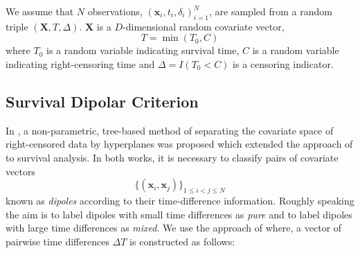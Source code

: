 \documentclass[sn-mathphys]{sn-jnl}%
\theoremstyle{thmstyleone}%
\theoremstyle{thmstyletwo}%
\theoremstyle{thmstylethree}%
\begin{document}
We assume that $N$ observations, $(\mathbf{x}_i, t_i, \delta_i)_{i = 1}^N$, are sampled from a random triple $(\mathbf{X}, T, \Delta)$.  $\mathbf{X}$ is a $D$-dimensional random covariate vector,
\[
T = \min(T_0, C)
\]
where $T_0$ is a random variable indicating survival time, $C$ is a random variable indicating right-censoring time and $\Delta = I(T_0 < C)$ is a censoring indicator.

\subsection{Survival Dipolar Criterion}

In \cite{kretowska}, a non-parametric, tree-based method of separating the covariate space of right-censored data by hyperplanes was proposed which extended the approach of \cite{bobrowskikretowski} to survival analysis. In both works, it is necessary to classify pairs of covariate vectors
\[
\{ (\mathbf{x}_i, \mathbf{x}_j) \}_{ 1 \leq i < j \leq N }
\]
known as \textit{dipoles} according to their time-difference information. Roughly speaking the aim is to label dipoles with small time differences as \textit{pure} and to label dipoles with large time differences as \textit{mixed}. We use the approach of \cite{kretowska} where, a vector of pairwise time differences $\Delta T$ is constructed as follows:

\end{document}

